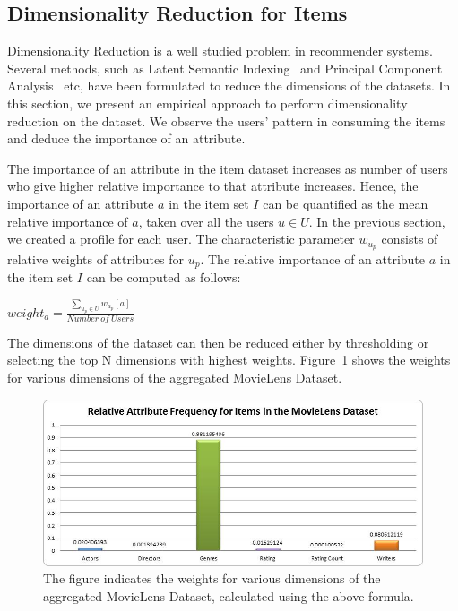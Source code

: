 \documentclass{acm_proc_article-sp}
\begin{document}
\subsection{Dimensionality Reduction for Items}
\label{sec:dimRed}

Dimensionality Reduction is a well studied problem in recommender systems. Several methods, such as Latent Semantic Indexing~\cite{badrul} and Principal Component Analysis~\cite{cureton} etc, have been formulated to reduce the dimensions of the datasets. In this section, we present an empirical approach to perform dimensionality reduction on the dataset. We observe the users' pattern in consuming the items and deduce the importance of an attribute.

The importance of an attribute in the item dataset increases as number of users who give higher relative importance to that attribute increases. Hence, the importance of an attribute $a$ in the item set $I$ can be quantified as the mean relative importance of $a$, taken over all the users $u \in U$. In the previous section, we created a profile for each user. The characteristic parameter $w_{u_p}$ consists of relative weights of attributes for $u_p$. The relative importance of an attribute $a$ in the item set $I$ can be computed as follows:

$weight_a = \frac{\sum_{u_p \in U} w_{u_p}[a]}{Number\ of\ Users}$

The dimensions of the dataset can then be reduced either by thresholding or selecting the top N dimensions with highest weights. Figure~\ref{attribRelFreq_items} shows the weights for various dimensions of the aggregated MovieLens Dataset.

\begin{figure}[htp]
\centering
\includegraphics[scale=0.4]{Results/attribRelFreq_items.jpg}
\caption{The figure indicates the weights for various dimensions of the aggregated MovieLens Dataset, calculated using the above formula.}
\label{attribRelFreq_items}
\end{figure}
\end{document}
